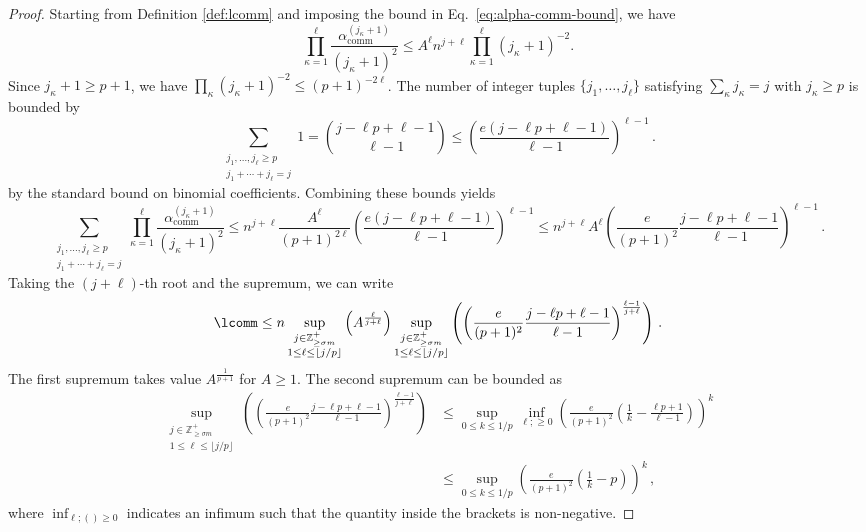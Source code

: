 \begin{proof}
    Starting from Definition \ref{def:lcomm} and imposing the bound in Eq.~\eqref{eq:alpha-comm-bound}, we have
    \begin{equation}
    \prod_{\kappa=1}^{\ell}
    \frac{\alpha_{\mathrm{comm}}^{(j_\kappa + 1)}}{(j_\kappa + 1)^2}
    \le
    A^{\ell} n^{j+\ell}
    \prod_{\kappa=1}^{\ell} (j_\kappa + 1)^{-2}.
    \end{equation}
    Since $j_\kappa + 1 \ge p + 1$, we have $\prod_{\kappa} (j_\kappa + 1)^{-2} \le (p + 1)^{-2\ell}$.
    The number of integer tuples $\{j_1, \ldots, j_\ell\}$ satisfying $\sum_{\kappa} j_\kappa = j$ with $j_\kappa \ge p$ is bounded by
    \begin{equation}
    \sum_{\substack{j_1, \dots, j_\ell \ge p \\ j_1 + \cdots + j_\ell = j}} 1
    =
    \binom{j - \ell p + \ell - 1}{\ell - 1}
    \le
    \left(\frac{e (j-\ell p+\ell-1)}{\ell-1}\right)^{\ell-1}\,.
    \end{equation}
    by the standard bound on binomial coefficients.
    Combining these bounds yields
    \begin{equation}
    \sum_{\substack{j_1, \dots, j_\ell \ge p \\ j_1 + \cdots + j_\ell = j}}
    \prod_{\kappa=1}^{\ell}
    \frac{\alpha_{\mathrm{comm}}^{(j_\kappa + 1)}}{(j_\kappa + 1)^2}
    \le n^{j+\ell}
    \frac{A^{\ell} }{(p + 1)^{2\ell}}   \left(\frac{e (j-\ell p+\ell-1)}{\ell-1}\right)^{\ell-1} \leq n^{j+\ell}
    A^{\ell}    \left(\frac{e }{(p + 1)^{2}} \frac{  j-\ell p+\ell-1}{\ell-1}\right)^{\ell-1}\,.
    \end{equation}
    Taking the $(j+\ell)$-th root and the supremum, we can write
    \begin{equation}
        \lcomm \leq n \sup_{\substack{j \in \mathbb{Z}^+_{\ge \sigma m} \\ 1 \le \ell \le \lfloor j/p \rfloor}} \left( A^{\frac{\ell}{j + \ell}} \right) \sup_{\substack{j \in \mathbb{Z}^+_{\ge \sigma m} \\ 1 \le \ell \le \lfloor j/p \rfloor}} \left(\left(\frac{e }{(p + 1)^{2}} \frac{j-\ell p+\ell-1}{\ell-1}\right)^{\frac{\ell-1}{j+ \ell}} \right)\,.
    \end{equation}
    The first supremum takes value $A^{\frac{1}{p+1}}$ for $A \geq 1$.
    The second supremum can be bounded as
    \begin{align}
        \sup_{\substack{j \in \mathbb{Z}^+_{\ge \sigma m} \\ 1 \le \ell \le \lfloor j/p \rfloor}} \left( \left( \frac{e }{(p + 1)^{2}} \frac{j-\ell p+\ell-1}{\ell-1}\right)^{\frac{\ell-1}{j+ \ell}} \right) &\leq  \sup_{0\leq k \leq 1/p} \inf_{\ell; \geq 0} \left(\frac{e }{(p + 1)^{2}} \left( \frac{1}{k} - \frac{\ell p +1}{\ell-1} \right) \right)^{k}  \\
        &\leq  \sup_{0\leq k \leq 1/p} \left(\frac{e }{(p + 1)^{2}}
         \left( \frac{1}{k} - p \right) \right)^{k}\,,
    \end{align}
    where $\inf_{\ell; ()\geq 0}$ indicates an infimum such that the quantity inside the brackets is non-negative. 
\end{proof}


